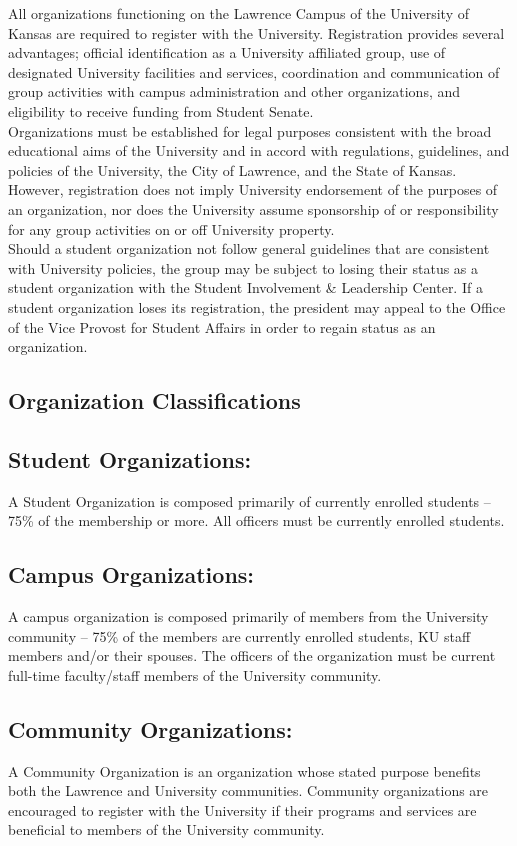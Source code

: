 All organizations functioning on the Lawrence Campus of the University of Kansas are required to register with the University. Registration provides several advantages; official identification as a University affiliated group, use of designated University facilities and services, coordination and communication of group activities with campus administration and other organizations, and eligibility to receive funding from Student Senate.
\\
Organizations must be established for legal purposes consistent with the broad educational aims of the University and in accord with regulations, guidelines, and policies of the University, the City of Lawrence, and the State of Kansas. However, registration does not imply University endorsement of the purposes of an organization, nor does the University assume sponsorship of or responsibility for any group activities on or off University property.
\\
Should a student organization not follow general guidelines that are consistent with University policies, the group may be subject to losing their status as a student organization with the Student Involvement \& Leadership Center. If a student organization loses its registration, the president may appeal to the Office of the Vice Provost for Student Affairs in order to regain status as an organization.

\subsection{Organization Classifications}

\subsection*{Student Organizations:} A Student Organization is composed primarily of currently enrolled students – 75\% of the membership or more. All officers must be currently enrolled students.
\subsection*{Campus Organizations:} A campus organization is composed primarily of members from the University community – 75\% of the members are currently enrolled students, KU staff members and/or their spouses. The officers of the organization must be current full-time faculty/staff members of the University community.
\subsection*{Community Organizations:} A Community Organization is an organization whose stated purpose benefits both the Lawrence and University communities. Community organizations are encouraged to register with the University if their programs and services are beneficial to members of the University community.

